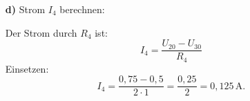 {\begin{itemize}
            Die Lösung ergibt:
            \[ U_{10} = 1,5 \, \text{V}, \quad U_{20} = 0,75 \, \text{V}, \quad U_{30} = 0,5 \, \text{V}. \]

        \item[\bf d)]
            Strom \(I_4\) berechnen:

            Der Strom durch \(R_4\) ist:
            \[ I_4 = \frac{U_{20} - U_{30}}{R_4} \]
            Einsetzen:
            \[ I_4 = \frac{0,75 - 0,5}{2 \cdot 1} = \frac{0,25}{2} = 0,125 \, \text{A}. \]

	\end{itemize}
}